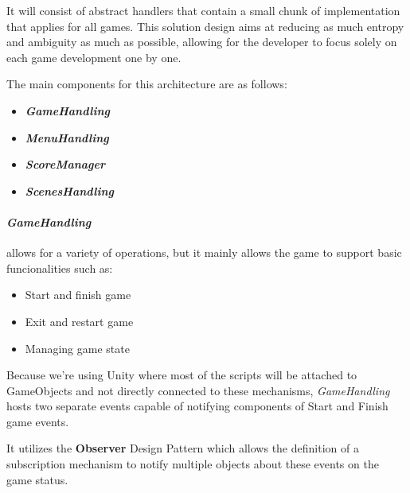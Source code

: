 It will consist of abstract handlers that contain a small chunk of implementation that applies for all games. This solution design aims at reducing as much entropy and ambiguity as much as possible, allowing for the developer to focus solely on each game development one by one.

The main components for this architecture are as follows:
\begin{itemize}
    \item \textbf{\textit{GameHandling}}
    \item  \textbf{\textit{MenuHandling}}
    \item \textbf{\textit{ScoreManager}}
    \item \textbf{\textit{ScenesHandling}}
\end{itemize}



\newpage
\paragraph{\textit{GameHandling}} allows for a variety of operations, but it mainly allows the game to support basic funcionalities such as:

\vspace{-\topsep}  %
\begin{itemize}
    \setlength{\itemsep}{8pt}  %
    \setlength{\parskip}{0pt}  %
    \item Start and finish game
    \item Exit and restart game
    \item Managing game state
\end{itemize}
\vspace{-\topsep}  %

Because we're using Unity where most of the scripts will be attached to GameObjects and not directly connected to these mechanisms, \textit{GameHandling} hosts two separate events capable of notifying components of Start and Finish game events.

It utilizes the \textbf{Observer} Design Pattern \cite{observer} which allows the definition of a subscription mechanism to notify multiple objects about these events on the game status.

